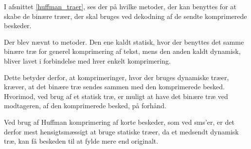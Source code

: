 I afsnittet \ref{huffman_traer}, ses der på hvilke metoder, der kan benyttes for at skabe de binære træer, der skal bruges ved dekodning af de sendte komprimerede beskeder.

Der blev nævnt to metoder. Den ene kaldt statisk, hvor der benyttes det samme binære træ for generel komprimering af tekst, mens den anden kaldt dynamisk, bliver lavet i forbindelse med hver enkelt komprimering.

Dette betyder derfor, at komprimeringer, hvor der bruges dynamiske træer, kræver, at det binære træ sendes sammen med den komprimerede besked. Hvorimod, ved brug af et statisk træ, er muligt at have det binære træ ved modtageren, af den komprimerede besked, på forhånd.

Ved brug af Huffman komprimering af korte beskeder, som ved sms’er, er det derfor mest hensigtsmæssigt at bruge statiske træer, da et medsendt dynamisk træ, kan få beskeden til at fylde mere end originalt.
